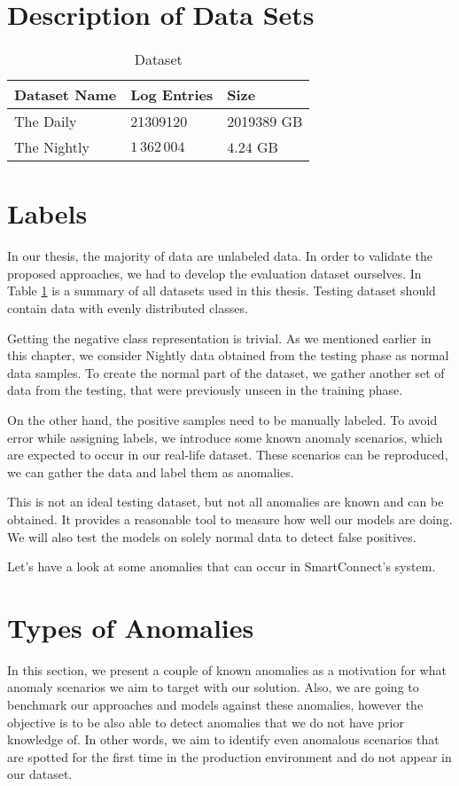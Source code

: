 \section{Description of Data Sets}
\begin{table}[!h]
\centering
\begin{tabular}{@{}lll@{}}
\toprule
\textbf{Dataset Name} & \textbf{Log Entries}       & \textbf{Size}           \\ \toprule
The Daily    & 21309120      & 2019389 GB     \\
The Nightly      & $1\,362\,004$ & $4.24$ GB
\end{tabular}
\caption{Dataset}
\label{table:datasets}
\end{table}

\section{Labels}
In our thesis, the majority of data are unlabeled data. In order to validate the proposed approaches, we had to develop the evaluation dataset ourselves. In Table \ref{table:datasets} is a summary of all datasets used in this thesis. Testing dataset should contain data with evenly distributed classes.

Getting the negative class representation is trivial. As we mentioned earlier in this chapter, we consider Nightly data obtained from the testing phase as normal data samples. To create the normal part of the dataset, we gather another set of data from the testing, that were previously unseen in the training phase. 

On the other hand, the positive samples need to be manually labeled. To avoid error while assigning labels, we introduce some known anomaly scenarios, which are expected to occur in our real-life dataset. These scenarios can be reproduced, we can gather the data and label them as anomalies. 

This is not an ideal testing dataset, but not all anomalies are known and can be obtained. It provides a reasonable tool to measure how well our models are doing. We will also test the models on solely normal data to detect false positives. 

Let's have a look at some anomalies that can occur in SmartConnect's system.

\section{Types of Anomalies}
In this section, we present a couple of known anomalies as a motivation for what anomaly scenarios we aim to target with our solution.
Also, we are going to benchmark our approaches and models against these anomalies, however the objective is to be also able to detect anomalies that we do not have prior knowledge of. 
In other words, we aim to identify even anomalous scenarios that are spotted for the first time in the production environment and do not appear in our dataset.

